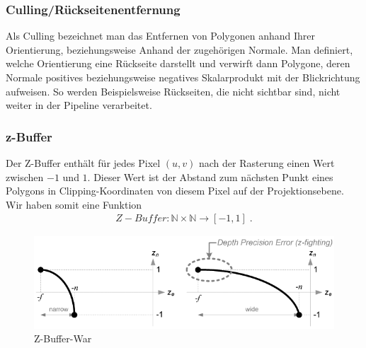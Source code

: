 \begin{Algorithmus}
\end{Algorithmus}

\subsubsection*{Culling/Rückseitenentfernung}
Als Culling bezeichnet man das Entfernen von Polygonen anhand Ihrer Orientierung, beziehungsweise Anhand der zugehörigen Normale. Man definiert, welche Orientierung eine Rückseite darstellt und verwirft dann Polygone, deren Normale positives beziehungsweise negatives Skalarprodukt mit der Blickrichtung aufweisen. So werden Beispielsweise Rückseiten, die nicht sichtbar sind, nicht weiter in der Pipeline verarbeitet.

\subsubsection* {z-Buffer}
Der Z-Buffer enthält für jedes Pixel $(u,v)$ nach der Rasterung  einen Wert zwischen $-1$ und $1$. Dieser Wert  ist der Abstand zum nächsten Punkt eines Polygons  in Clipping-Koordinaten von diesem Pixel auf der Projektionsebene.  Wir haben somit eine Funktion
\begin{align*}
Z-Buffer : \mathbb{N} \times \mathbb{N} \to [-1,1]  \; .
\end{align*}

\begin{figure}[H]
    \centering
    \includegraphics[width=1.0\textwidth]{images/gl_projectionmatrix_zbuffer_1.png}
    \caption{Z-Buffer-War}
    \label{fig:zbuffer-war}
\end{figure}



